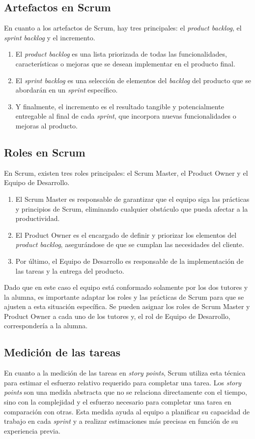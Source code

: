 \subsection{Artefactos en Scrum}
En cuanto a los artefactos de Scrum, hay tres principales: el \textit{product backlog}, el \textit{sprint backlog} y el incremento. 
\begin{enumerate}
    \item El \textit{product backlog} es una lista priorizada de todas las funcionalidades, características o mejoras que se desean implementar en el producto final. 
    \item El \textit{sprint backlog} es una selección de elementos del \textit{backlog} del producto que se abordarán en un \textit{sprint} específico. 
    \item Y finalmente, el incremento es el resultado tangible y potencialmente entregable al final de cada \textit{sprint}, que incorpora nuevas funcionalidades o mejoras al producto.
\end{enumerate}

\subsection{Roles en Scrum}
En Scrum, existen tres roles principales: el Scrum Master, el Product Owner y el Equipo de Desarrollo. 
\begin{enumerate}
    \item El Scrum Master es responsable de garantizar que el equipo siga las prácticas y principios de Scrum, eliminando cualquier obstáculo que pueda afectar a la productividad. 
    \item El Product Owner es el encargado de definir y priorizar los elementos del \textit{product backlog}, asegurándose de que se cumplan las necesidades del cliente. 
    \item Por último, el Equipo de Desarrollo es responsable de la implementación de las tareas y la entrega del producto.
\end{enumerate}

Dado que en este caso el equipo está conformado solamente por los dos tutores y la alumna, es importante adaptar los roles y las prácticas de Scrum para que se ajusten a esta situación específica. Se pueden asignar los roles de Scrum Master y Product Owner a cada uno de los tutores y, el rol de Equipo de Desarrollo, correspondería a la alumna. 

\subsection{Medición de las tareas}
En cuanto a la medición de las tareas en \textit{story points}, Scrum utiliza esta técnica para estimar el esfuerzo relativo requerido para completar una tarea. Los \textit{story points} son una medida abstracta que no se relaciona directamente con el tiempo, sino con la complejidad y el esfuerzo necesario para completar una tarea en comparación con otras. Esta medida ayuda al equipo a planificar su capacidad de trabajo en cada \textit{sprint} y a realizar estimaciones más precisas en función de su experiencia previa.


